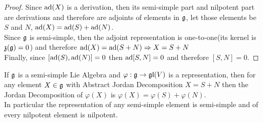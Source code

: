 \begin{proof}
Since $\text{ad}(X)$ is a derivation, then its semi-simple part and nilpotent part are derivations and therefore are adjoints of elements in $\mathfrak{g}$, let those elements be $S$ and $N$, $\text{ad}(X)=\text{ad}(S)+\text{ad}(N)$.\\
Since $\mathfrak{g}$ is semi-simple, then the adjoint representation is one-to-one(its kernel is $\mathfrak{z}(\mathfrak{g})=0$) and therefore $\text{ad}(X)=\text{ad}(S+N) \Rightarrow X=S+N$\\
Finally, since $[\text{ad}(S),\text{ad}(N)]=0$ then $\text{ad}[S,N]=0$ and therefore $[S,N]=0$.
\end{proof}
\begin{prop}
	If $\mathfrak{g}$ is a semi-simple Lie Algebra and $\varphi:\mathfrak{g} \rightarrow \mathfrak{gl}(V)$ is a representation, then for any element $X \in \mathfrak{g}$ with Abstract Jordan Decomposition $X=S+N$ then the Jordan Decomposition of $\varphi(X)$ is $\varphi(X)=\varphi(S)+\varphi(N)$.\\
	In particular the representation of any semi-simple element is semi-simple and of every nilpotent element is nilpotent.
	\label{PreservationOfAbsJordan} 
\end{prop}
